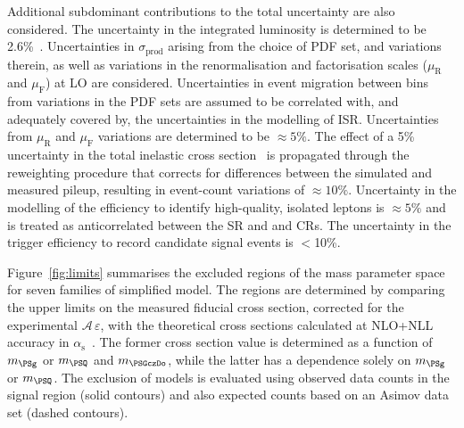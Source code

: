 Additional subdominant contributions to the total uncertainty are also
considered. The uncertainty in the integrated luminosity is determined
to be 2.6\%~\cite{}. Uncertainties in $\sigma_\text{prod}$ arising
from the choice of PDF set, and variations therein, as well as
variations in the renormalisation and factorisation scales
($\mu_\text{R}$ and $\mu_\text{F}$) at LO are
considered. Uncertainties in event migration between bins from
variations in the PDF sets are assumed to be correlated with, and
adequately covered by, the uncertainties in the modelling of
ISR. Uncertainties from $\mu_\text{R}$ and $\mu_\text{F}$ variations
are determined to be ${\approx}5\%$. The effect of a 5\% uncertainty
in the total inelastic cross section~\cite{Aaboud:2016mmw} is
propagated through the reweighting procedure that corrects for
differences between the simulated and measured pileup, resulting in
event-count variations of ${\approx}10\%$. Uncertainty in the
modelling of the efficiency to identify high-quality, isolated leptons
is ${\approx}5\%$ and is treated as anticorrelated between the SR and
\mj and \mmj CRs. The uncertainty in the trigger efficiency to record
candidate signal events is $<$10\%.


Figure~\ref{fig:limits} summarises the excluded regions of the
mass parameter space for seven families of simplified model. The
regions are determined by comparing the upper limits on the measured
fiducial cross section, corrected for the experimental
$\mathcal{A}\,\varepsilon$, with the theoretical cross sections
calculated at NLO+NLL accuracy in
$\alpha_\mathrm{s}$~\cite{susynlo}. The former cross section value is
determined as a function of $m_{\PSg}$ or $m_{\PSQ}$ and
$m_{\PSGczDo}$, while the latter has a dependence solely on $m_{\PSg}$
or $m_{\PSQ}$.  The exclusion of models is evaluated using observed
data counts in the signal region (solid contours) and also expected
counts based on an Asimov data set (dashed contours).

%
%
%

